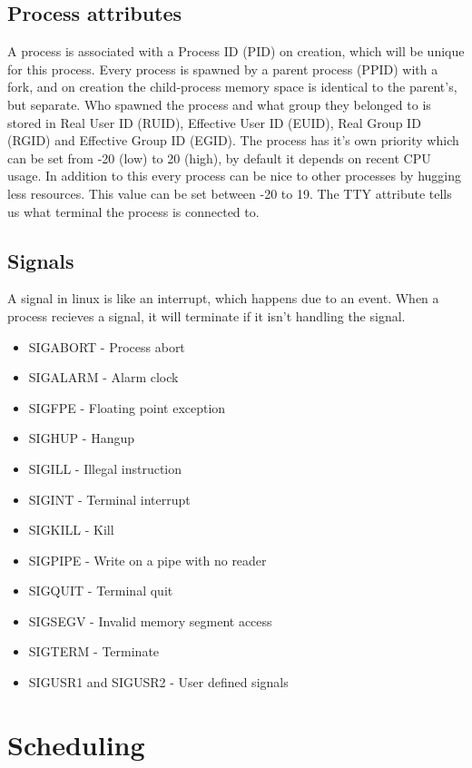 \documentclass[12pt]{article}
\begin{document}
\subsection{Process attributes}
A process is associated with a Process ID (PID) on creation, which will be unique for this process. 
Every process is spawned by a parent process (PPID) with a fork, and on creation the child-process memory space is identical to the parent's, but separate.
Who spawned the process and what group they belonged to is stored in Real User ID (RUID), Effective User ID (EUID), Real Group ID (RGID) and Effective Group ID (EGID).
The process has it's own priority which can be set from -20 (low) to 20 (high), by default it depends on recent CPU usage. 
In addition to this every process can be nice to other processes by hugging less resources. This value can be set between -20 to 19.
The TTY attribute tells us what terminal the process is connected to.

\subsection{Signals}
A signal in linux is like an interrupt, which happens due to an event. 
When a process recieves a signal, it will terminate if it isn't handling the signal.
\begin{itemize}
  \item SIGABORT - Process abort
  \item SIGALARM - Alarm clock
  \item SIGFPE - Floating point exception
  \item SIGHUP - Hangup
  \item SIGILL - Illegal instruction
  \item SIGINT - Terminal interrupt
  \item SIGKILL - Kill
  \item SIGPIPE - Write on a pipe with no reader
  \item SIGQUIT - Terminal quit
  \item SIGSEGV - Invalid memory segment access
  \item SIGTERM - Terminate
  \item SIGUSR1 and SIGUSR2 - User defined signals
\end{itemize}

\section{Scheduling} %
\end{document}
